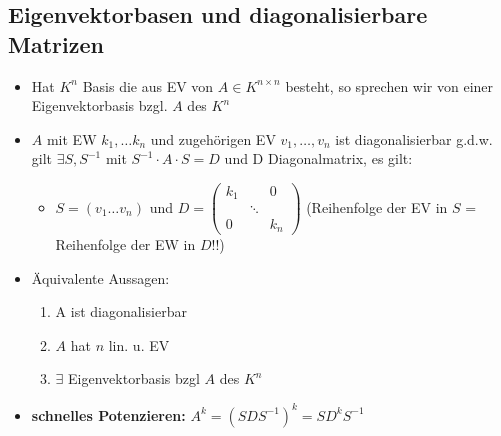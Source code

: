 \documentclass[10pt,a4paper]{article}
\begin{document}
\subsection{Eigenvektorbasen und diagonalisierbare Matrizen}
\begin{itemize}
\item Hat $K^{n}$ Basis die aus EV von $A\in K^{n\times n}$ besteht, so sprechen wir von einer Eigenvektorbasis bzgl. $A$ des $K^{n}$
\item $A$ mit EW $k_{1},\dotsc k_{n}$ und zugehörigen EV $v_{1},\dotsc,v_{n}$ ist diagonalisierbar g.d.w. gilt $\exists S,S^{-1}$ mit $S^{-1}\cdot A \cdot S =D$ und D Diagonalmatrix, es gilt:
\begin{itemize}
\item$S=(v_{1}\dotsc v_{n})$ und $ D=\begin{pmatrix}
k_{1}&&0\\&\ddots&\\0&&k_{n}
\end{pmatrix}$ (Reihenfolge der EV in $S$ = Reihenfolge der EW in $D$!!)
\end{itemize}
\item Äquivalente Aussagen:
\begin{enumerate}
\item A ist diagonalisierbar
\item $A$ hat $n$ lin. u. EV
\item $\exists$ Eigenvektorbasis bzgl $A$ des $K^{n}$
\end{enumerate}
\item \textbf{schnelles Potenzieren:} $A^{k}=(SDS^{-1})^{k}=SD^{k}S^{-1}$
\end{itemize}
\end{document}
